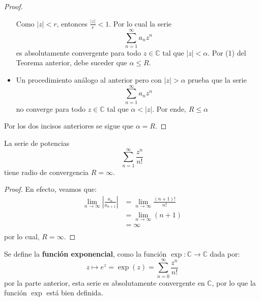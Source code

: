 \documentclass[12pt]{report}
\newcounter{it}
\theoremstyle{largebreak}
\newcommand\abs[1]{\ensuremath{\left|#1\right|}}
\newcommand\cf[3]{\ensuremath{#1:#2\rightarrow#3}}
\newcommand{\tbf}[1]{\textbf{#1}}
\begin{document}
\begin{proof}
\begin{itemize}
\begin{equation*}
            \end{equation*}
            Como $\abs{z}<r$, entonces $\frac{\abs{z}}{r}<1$. Por lo cual la serie
            \begin{equation*}
                \sum_{ n=1}^\infty a_nz^n
            \end{equation*}
            es absolutamente convergente para todo $z\in\mathbb{C}$ tal que $\abs{z}<\alpha$. Por (1) del Teorema anterior, debe suceder que $\alpha\leq R$.
            \item Un procedimiento análogo al anterior pero con $\abs{z}>\alpha$ prueba que la serie
            \begin{equation*}
                \sum_{ n=1}^\infty a_nz^n
            \end{equation*}
            no converge para todo $z\in\mathbb{C}$ tal que $\alpha<\abs{z}$. Por ende, $R\leq \alpha$
        \end{itemize}
        Por los dos incisos anteriores se sigue que $\alpha=R$.
    \end{proof}

    \begin{exa}
        La serie de potencias
        \begin{equation*}
            \sum_{ n=1}^\infty\frac{z^n}{n!}
        \end{equation*}
        tiene radio de convergencia $R=\infty$.
    \end{exa}

    \begin{proof}
        En efecto, veamos que:
        \begin{equation*}
            \begin{split}
                \lim_{n\rightarrow\infty}\abs{\frac{a_{ n}}{a_{n+1}}}&=\lim_{n\rightarrow\infty}\frac{(n+1)!}{n!}\\
                &=\lim_{n\rightarrow\infty}(n+1)\\
                &=\infty\\
            \end{split}
        \end{equation*}
        por lo cual, $R=\infty$.
    \end{proof}

    \begin{mydef}
        Se define la \tbf{función exponencial}, como la función $\cf{\exp}{\mathbb{C}}{\mathbb{C}}$ dada por:
        \begin{equation*}
            z\mapsto e^z=\exp(z)=\sum_{ n=0}^\infty\frac{z^n}{n!}
        \end{equation*}
        por la parte anterior, esta serie es absolutamente convergente en $\mathbb{C}$, por lo que la función $\exp$ está bien definida.
    \end{mydef}
\end{document}
